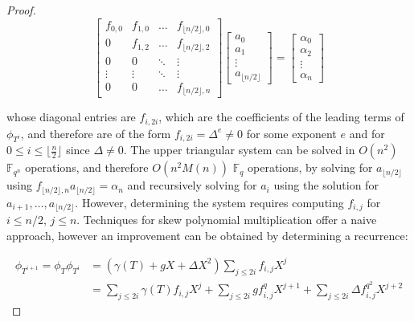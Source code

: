 \documentclass{acmart}
\theoremstyle{remark}
\numberwithin{equation}{section}
\begin{document}
\begin{proof}
\begin{equation}
\begin{bmatrix} f_{0,0} & f_{1,0} & \ldots & f_{\lfloor n/2 \rfloor, 0} \\
                 0      & f_{1,2} & \ldots & f_{\lfloor n/2 \rfloor, 2}  \\
                 0      & 0       & \ddots & \vdots                      \\
                 \vdots  & \vdots  &  \ddots      & \vdots                       \\
                 0  & 0 & \ldots & f_{\lfloor n/2 \rfloor, n}
\end{bmatrix}
\begin{bmatrix}
a_0 \\ a_1 \\ \vdots \\ a_{\lfloor n/2 \rfloor}
\end{bmatrix} = \begin{bmatrix} \alpha_{0} \\ \alpha_{2} \\ \vdots \\ \alpha_{n} \end{bmatrix}
\end{equation}

\noindent whose diagonal entries are $f_{i,2i}$, which are the coefficients of the leading terms of $\phi_{T^i}$, and therefore are of the form $f_{i,2i} = \Delta^e \neq 0$ for some exponent $e$ and for $0 \leq i \leq \lfloor \frac{n}{2} \rfloor$ since $\Delta \neq 0$. The upper triangular system can be solved in $O(n^2)$ $\mathbb{F}_{q^n}$ operations, and therefore $O(n^2M(n))$ $\mathbb{F}_{q}$ operations, by solving for $a_{\lfloor n/2 \rfloor}$ using $f_{\lfloor n/2 \rfloor, n}a_{\lfloor n/2 \rfloor} = \alpha_{n}$ and recursively solving for $a_i$ using the solution for $a_{i+1}, \ldots, a_{\lfloor n/2 \rfloor}$. However, determining the system requires computing $f_{i,j}$ for $i \leq n/2$, $j \leq n$. Techniques for skew polynomial multiplication offer a naive approach, however an improvement can be obtained by determining a recurrence:

\begin{align*}
 \phi_{T^{i+1}} = \phi_T \phi_{T^i} & = (\gamma(T) + gX + \Delta X^2) \sum_{j \leq 2i} f_{i,j} X^{j} \\
 &= \sum_{j \leq 2i} \gamma(T) f_{i,j} X^{j} + \sum_{j \leq 2i} g f_{i,j}^q X^{j+1} + \sum_{j \leq 2i} \Delta f_{i,j}^{q^2} X^{j+2}
\end{align*}


\end{proof}
\end{document}
